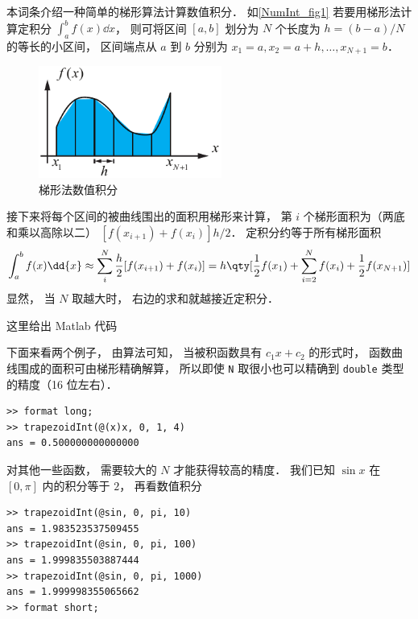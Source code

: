 

本词条介绍一种简单的梯形算法计算数值积分． 如\autoref{NumInt_fig1} 若要用梯形法计算定积分 $\int_a^b f(x) \dd{x}$， 则可将区间 $[a, b]$ 划分为 $N$ 个长度为 $h = (b-a)/N$ 的等长的小区间， 区间端点从 $a$ 到 $b$ 分别为 $x_1 = a, x_2 = a + h, \dots, x_{N+1} = b$．

\begin{figure}[ht]
\centering
\includegraphics[width=6cm]{./figures/NumInt_1.pdf}
\caption{梯形法数值积分} \label{NumInt_fig1}
\end{figure}

接下来将每个区间的被曲线围出的面积用梯形来计算， 第 $i$ 个梯形面积为（两底和乘以高除以二）
$[f(x_{i+1}) + f(x_i)]h/2$． 定积分约等于所有梯形面积
\begin{equation}
\int_a^b f(x) \dd{x} \approx \sum_i^N  \frac h2 [f(x_{i+1}) + f(x_i)]
= h\qty[ \frac12 f(x_1) + \sum_{i = 2}^N f(x_i) + \frac12 f(x_{N+1})]
\end{equation}
显然， 当 $N$ 取越大时， 右边的求和就越接近定积分．

这里给出 Matlab 代码

下面来看两个例子， 由算法可知， 当被积函数具有 $c_1 x + c_2$ 的形式时， 函数曲线围成的面积可由梯形精确解算， 所以即使 \lstinline|N| 取很小也可以精确到 \lstinline|double| 类型的精度（16 位左右）．
\begin{lstlisting}[language=matlabC]
>> format long;
>> trapezoidInt(@(x)x, 0, 1, 4)
ans = 0.500000000000000
\end{lstlisting}
对其他一些函数， 需要较大的 $N$ 才能获得较高的精度． 我们已知 $\sin x$ 在 $[0, \pi]$ 内的积分等于 $2$， 再看数值积分
\begin{lstlisting}[language=matlabC]
>> trapezoidInt(@sin, 0, pi, 10)
ans = 1.983523537509455
>> trapezoidInt(@sin, 0, pi, 100)
ans = 1.999835503887444
>> trapezoidInt(@sin, 0, pi, 1000)
ans = 1.999998355065662
>> format short;
\end{lstlisting}
